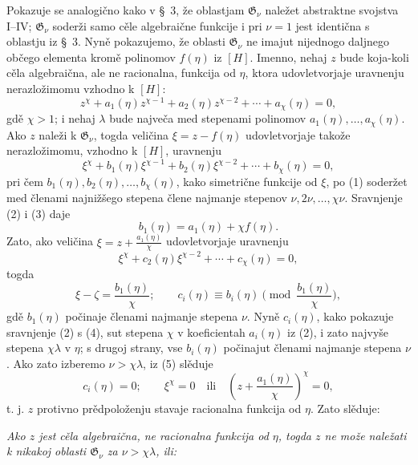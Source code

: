 \documentclass[11pt]{article}
\begin{document}
Pokazuje se analogično kako v \S\ 3, že oblastjam $\mathfrak G_\nu$ naležet
abstraktne svojstva I--IV; $\mathfrak G_\nu$ soderži samo cěle algebraične
funkcije i pri $\nu=1$ jest identična s oblastju iz \S\ 3. Nyně pokazujemo, že
oblasti $\mathfrak G_\nu$ ne imajut nijednogo daljnego občego elementa kromě
polinomov $f(\eta)$ iz $[H]$. Imenno, nehaj $z$ bude koja-koli cěla
algebraična, ale ne racionalna, funkcija od $\eta$, ktora udovletvorjaje
uravnenju nerazložimomu vzhodno k $[H]$:
\begin{equation}
z^\chi+a_1(\eta)z^{\chi-1}+a_2(\eta)z^{\chi-2}+\cdots+a_\chi(\eta)=0,
\tag{2}
\end{equation}
gdě $\chi>1$; i nehaj $\lambda$ bude največa med stepenami polinomov
$a_1(\eta),\ldots,a_\chi(\eta)$. Ako $z$ naleži k $\mathfrak G_\nu$, togda
veličina $\xi=z-f(\eta)$ udovletvorjaje takože nerazložimomu, vzhodno k $[H]$,
uravnenju
\begin{equation}
\xi^\chi+b_1(\eta)\xi^{\chi-1}+b_2(\eta)\xi^{\chi-2}+\cdots+b_\chi(\eta)=0,
\tag{3}
\end{equation}
pri čem $b_1(\eta),b_2(\eta),\ldots,b_\chi(\eta)$, kako simetrične funkcije od
$\xi$, po (1) soderžet med členami najnižšego stepena člene najmanje stepenov
$\nu,2\nu,\ldots,\chi\nu$. Sravnjenje (2) i (3) daje
\[
 b_1(\eta)=a_1(\eta)+\chi f(\eta).
\]
Zato, ako veličina $\xi=z+\frac{a_1(\eta)}{\chi}$ udovletvorjaje uravnenju
\begin{equation}
\xi^\chi+c_2(\eta)\xi^{\chi-2}+\cdots+c_\chi(\eta)=0,
\tag{4}
\end{equation}
togda
\begin{equation}
 \xi-\zeta=\frac{b_1(\eta)}{\chi};
 \qquad
 c_i(\eta)\equiv b_i(\eta)\pmod{\frac{b_1(\eta)}{\chi}},
\tag{5}
\end{equation}
gdě $b_1(\eta)$ počinaje členami najmanje stepena $\nu$. Nyně $c_i(\eta)$,
kako pokazuje sravnjenje (2) s (4), sut stepena $\chi$ v koeficientah
$a_i(\eta)$ iz (2), i zato najvyše stepena $\chi\lambda$ v $\eta$; s drugoj
strany, vse $b_i(\eta)$ počinajut členami najmanje stepena $\nu$. Ako zato
izberemo $\nu>\chi\lambda$, iz (5) slěduje
\[
 c_i(\eta)=0;\qquad
 \xi^\chi=0\quad\text{ili}\quad
 \left(z+\frac{a_1(\eta)}{\chi}\right)^\chi=0,
\]
t. j. $z$ protivno prědpoloženju stavaje racionalna funkcija od $\eta$. Zato
slěduje:

{\itshape Ako $z$ jest cěla algebraična, ne racionalna funkcija od $\eta$, togda
$z$ ne može naležati k nikakoj oblasti $\mathfrak G_\nu$ za
$\nu>\chi\lambda$, ili:}
\end{document}
